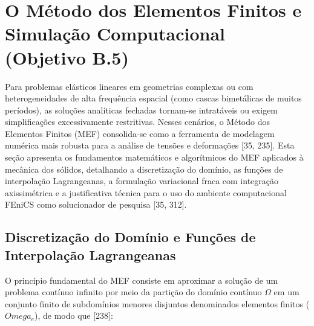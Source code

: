 \section{O Método dos Elementos Finitos e Simulação Computacional (Objetivo B.5)}

Para problemas elásticos lineares em geometrias complexas ou com heterogeneidades de alta frequência espacial (como cascas bimetálicas de muitos períodos), as soluções analíticas fechadas tornam-se intratáveis ou exigem simplificações excessivamente restritivas. Nesses cenários, o Método dos Elementos Finitos (MEF) consolida-se como a ferramenta de modelagem numérica mais robusta para a análise de tensões e deformações [35, 235]. Esta seção apresenta os fundamentos matemáticos e algorítmicos do MEF aplicados à mecânica dos sólidos, detalhando a discretização do domínio, as funções de interpolação Lagrangeanas, a formulação variacional fraca com integração axissimétrica e a justificativa técnica para o uso do ambiente computacional FEniCS como solucionador de pesquisa [35, 312].

\subsection{Discretização do Domínio e Funções de Interpolação Lagrangeanas}

O princípio fundamental do MEF consiste em aproximar a solução de um problema contínuo infinito por meio da partição do domínio contínuo $\Omega$ em um conjunto finito de subdomínios menores disjuntos denominados elementos finitos ($Omega_e$), de modo que [238]:

